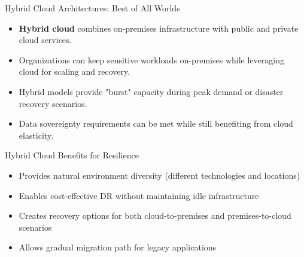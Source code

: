 \documentclass{beamer}
\begin{document}
\begin{frame}{Hybrid Cloud Architectures: Best of All Worlds}
    \begin{itemize}
        \item \textbf{Hybrid cloud} combines on-premises infrastructure with public and private cloud services.
        \item Organizations can keep sensitive workloads on-premises while leveraging cloud for scaling and recovery.
        \item Hybrid models provide "burst" capacity during peak demand or disaster recovery scenarios.
        \item Data sovereignty requirements can be met while still benefiting from cloud elasticity.
    \end{itemize}
    
    \begin{block}{Hybrid Cloud Benefits for Resilience}
        \small
        \begin{itemize}
            \item Provides natural environment diversity (different technologies and locations)
            \item Enables cost-effective DR without maintaining idle infrastructure
            \item Creates recovery options for both cloud-to-premises and premises-to-cloud scenarios
            \item Allows gradual migration path for legacy applications
        \end{itemize}
    \end{block}
\end{frame}
\end{document}

